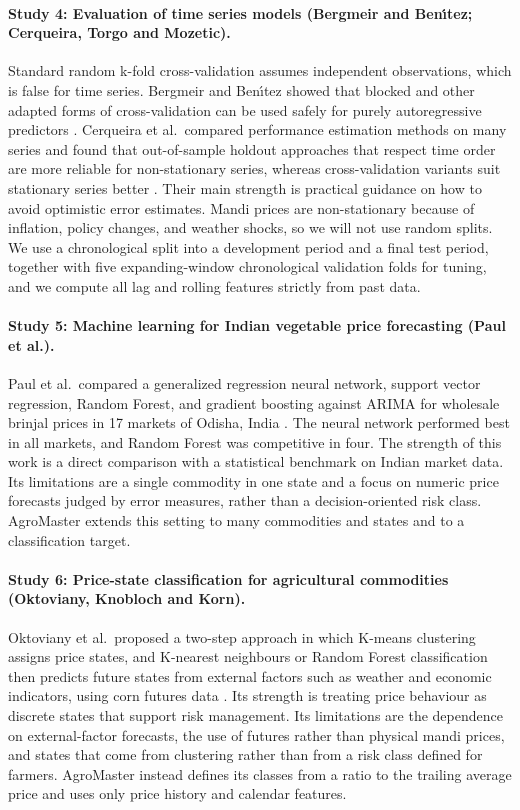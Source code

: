 \documentclass[12pt,a4paper]{article}
\begin{document}
\paragraph{Study 4: Evaluation of time series models (Bergmeir and Ben\'{\i}tez; Cerqueira, Torgo and Mozetic).}
Standard random k-fold cross-validation assumes independent observations, which is false for time series. Bergmeir and Ben\'{\i}tez showed that blocked and other adapted forms of cross-validation can be used safely for purely autoregressive predictors \cite{bergmeir2012use}. Cerqueira et al.\ compared performance estimation methods on many series and found that out-of-sample holdout approaches that respect time order are more reliable for non-stationary series, whereas cross-validation variants suit stationary series better \cite{cerqueira2020evaluating}. Their main strength is practical guidance on how to avoid optimistic error estimates. Mandi prices are non-stationary because of inflation, policy changes, and weather shocks, so we will not use random splits. We use a chronological split into a development period and a final test period, together with five expanding-window chronological validation folds for tuning, and we compute all lag and rolling features strictly from past data.

\paragraph{Study 5: Machine learning for Indian vegetable price forecasting (Paul et al.).}
Paul et al.\ compared a generalized regression neural network, support vector regression, Random Forest, and gradient boosting against ARIMA for wholesale brinjal prices in 17 markets of Odisha, India \cite{paul2022machine}. The neural network performed best in all markets, and Random Forest was competitive in four. The strength of this work is a direct comparison with a statistical benchmark on Indian market data. Its limitations are a single commodity in one state and a focus on numeric price forecasts judged by error measures, rather than a decision-oriented risk class. AgroMaster extends this setting to many commodities and states and to a classification target.

\paragraph{Study 6: Price-state classification for agricultural commodities (Oktoviany, Knobloch and Korn).}
Oktoviany et al.\ proposed a two-step approach in which K-means clustering assigns price states, and K-nearest neighbours or Random Forest classification then predicts future states from external factors such as weather and economic indicators, using corn futures data \cite{oktoviany2021machine}. Its strength is treating price behaviour as discrete states that support risk management. Its limitations are the dependence on external-factor forecasts, the use of futures rather than physical mandi prices, and states that come from clustering rather than from a risk class defined for farmers. AgroMaster instead defines its classes from a ratio to the trailing average price and uses only price history and calendar features.
\end{document}
